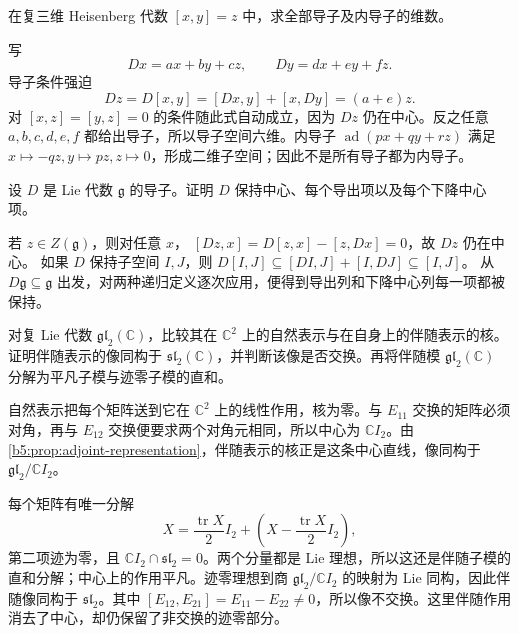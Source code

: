 \begin{exercise}\label{b5:ex:11-heisenberg-derivations}
	在复三维 Heisenberg 代数 \([x,y]=z\) 中，求全部导子及内导子的维数。
\end{exercise}
\begin{solution}
	写
	\[
		Dx=ax+by+cz,\qquad Dy=dx+ey+fz.
	\]
	导子条件强迫
	\[
		Dz=D[x,y]=[Dx,y]+[x,Dy]=(a+e)z.
	\]
	对 \([x,z]=[y,z]=0\) 的条件随此式自动成立，因为 \(Dz\) 仍在中心。反之任意 \(a,b,c,d,e,f\) 都给出导子，所以导子空间六维。内导子 \(\operatorname{ad}(px+qy+rz)\) 满足 \(x\mapsto-qz,y\mapsto pz,z\mapsto0\)，形成二维子空间；因此不是所有导子都为内导子。
\end{solution}

\begin{exercise}\label{b5:ex:11-derivation-preserves-series}
	设 \(D\) 是 Lie 代数 \(\mathfrak g\) 的导子。证明 \(D\) 保持中心、每个导出项以及每个下降中心项。
\end{exercise}
\begin{solution}
	若 \(z\in Z(\mathfrak g)\)，则对任意 \(x\)， \([Dz,x]=D[z,x]-[z,Dx]=0\)，故 \(Dz\) 仍在中心。 如果 \(D\) 保持子空间 \(I,J\)，则 \(D[I,J]\subseteq[DI,J]+[I,DJ]\subseteq[I,J]\)。 从 \(D\mathfrak g\subseteq\mathfrak g\) 出发，对两种递归定义逐次应用，便得到导出列和下降中心列每一项都被保持。
\end{solution}

\begin{exercise}\label{b5:ex:11-natural-versus-adjoint}
	对复 Lie 代数 \(\mathfrak{gl}_2(\mathbb C)\)，比较其在 \(\mathbb C^2\) 上的自然表示与在自身上的伴随表示的核。证明伴随表示的像同构于 \(\mathfrak{sl}_2(\mathbb C)\)，并判断该像是否交换。再将伴随模 \(\mathfrak{gl}_2(\mathbb C)\) 分解为平凡子模与迹零子模的直和。
\end{exercise}
\begin{solution}
	自然表示把每个矩阵送到它在 \(\mathbb C^2\) 上的线性作用，核为零。与 \(E_{11}\) 交换的矩阵必须对角，再与 \(E_{12}\) 交换便要求两个对角元相同，所以中心为 \(\mathbb CI_2\)。由\cref{b5:prop:adjoint-representation}，伴随表示的核正是这条中心直线，像同构于 \(\mathfrak{gl}_2/\mathbb CI_2\)。

	每个矩阵有唯一分解
	\[
		X=\frac{\operatorname{tr}X}{2}I_2+ \left(X-\frac{\operatorname{tr}X}{2}I_2\right),
	\]
	第二项迹为零，且 \(\mathbb CI_2\cap\mathfrak{sl}_2=0\)。两个分量都是 Lie 理想，所以这还是伴随子模的直和分解；中心上的作用平凡。迹零理想到商 \(\mathfrak{gl}_2/\mathbb CI_2\) 的映射为 Lie 同构，因此伴随像同构于 \(\mathfrak{sl}_2\)。其中 \([E_{12},E_{21}]=E_{11}-E_{22}\ne0\)，所以像不交换。这里伴随作用消去了中心，却仍保留了非交换的迹零部分。
\end{solution}

